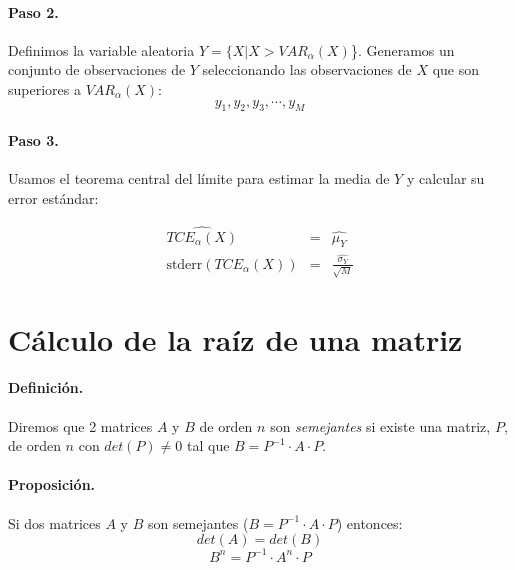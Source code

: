 \paragraph{Paso 2.} Definimos la variable aleatoria $Y = \{X|X > VAR_{\alpha}(X)$\}.
Generamos un conjunto de observaciones de $Y$ seleccionando las observaciones de $X$
que son superiores a $VAR_{\alpha}(X)$:
\begin{displaymath}
y_1, y_2, y_3, \cdots, y_M
\end{displaymath}

\paragraph{Paso 3.} Usamos el teorema central del l\'imite para estimar la media
de $Y$ y calcular su error est\'andar:

\begin{eqnarray}
\widehat{TCE_{\alpha}(X)} & = & \widehat{\mu_Y} \nonumber \\
\textrm{stderr}(TCE_\alpha(X)) & = & \frac{\widehat{\sigma_Y}}{\sqrt{M}} \nonumber
\end{eqnarray}


\section{C\'alculo de la ra\'iz de una matriz}
\label{apendix:sqrtmat}

\paragraph{Definici\'on.}
Diremos que 2 matrices $A$ y $B$ de orden $n$ son \emph{semejantes}
 si existe una matriz, $P$, de orden $n$ con
$det(P) \neq 0$ tal que $B = P^{-1} \cdot A \cdot P$.


\paragraph{Proposici\'on.} Si dos matrices $A$ y $B$ son semejantes 
($B = P^{-1} \cdot A \cdot P$) entonces:
\begin{displaymath}
det(A) = det(B)
\end{displaymath}
\begin{displaymath}
B^n = P^{-1} \cdot A^{n} \cdot P
\end{displaymath}


